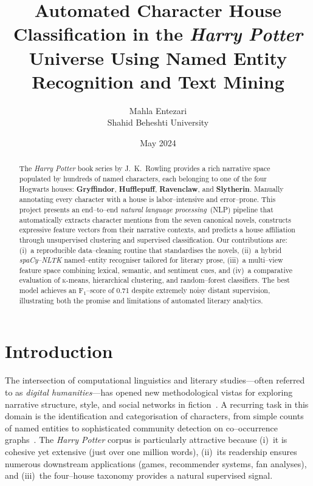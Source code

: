 \documentclass[12pt]{article}
\title{Automated Character House Classification in the \textit{Harry Potter} Universe Using Named Entity Recognition and Text Mining}
\author{Mahla Entezari \\ Shahid Beheshti University}
\date{May 2024}
\begin{document}
\maketitle
\begin{abstract}
The \textit{Harry Potter} book series by J.\ K.\ Rowling provides a rich narrative space populated by hundreds of named characters, each belonging to one of the four Hogwarts houses: \textbf{Gryffindor}, \textbf{Hufflepuff}, \textbf{Ravenclaw}, and \textbf{Slytherin}. 
Manually annotating every character with a house is labor--intensive and error--prone. This project presents an end--to--end \emph{natural language processing}~(NLP) pipeline that automatically extracts character mentions from the seven canonical novels, constructs expressive feature vectors from their narrative contexts, and predicts a house affiliation through unsupervised clustering and supervised classification. 
Our contributions are: (i)~a reproducible data--cleaning routine that standardises the novels, (ii)~a hybrid \textit{spaCy}--\textit{NLTK} named--entity recogniser tailored for literary prose, (iii)~a multi--view feature space combining lexical, semantic, and sentiment cues, and (iv)~a comparative evaluation of \textsc{k}-means, hierarchical clustering, and random--forest classifiers. The best model achieves an F$_1$--score of 0.71 despite extremely noisy distant supervision, illustrating both the promise and limitations of automated literary analytics.
\end{abstract}

\section{Introduction}
\label{sec:intro}
The intersection of computational linguistics and literary studies---often referred to as \emph{digital humanities}---has opened new methodological vistas for exploring narrative structure, style, and social networks in fiction~\cite{jockers2013macroanalysis,moretti2013distant}. 
A recurring task in this domain is the identification and categorisation of characters, from simple counts of named entities to sophisticated community detection on co--occurrence graphs~\cite{alber2012reading}. 
The \textit{Harry Potter} corpus is particularly attractive because (i)~it is cohesive yet extensive (just over one million words), (ii)~its readership ensures numerous downstream applications (games, recommender systems, fan analyses), and (iii)~the four--house taxonomy provides a natural supervised signal.
\end{document}
